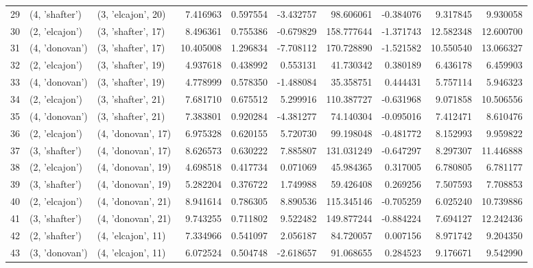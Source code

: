 \begin{tabular}{lllrrrrrrr}
29 &   (4, 'shafter') &  (3, 'elcajon', 20) &   7.416963 &   0.597554 &  -3.432757 &   98.606061 & -0.384076 &   9.317845 &   9.930058 \\
30 &   (2, 'elcajon') &  (3, 'shafter', 17) &   8.496361 &   0.755386 &  -0.679829 &  158.777644 & -1.371743 &  12.582348 &  12.600700 \\
31 &   (4, 'donovan') &  (3, 'shafter', 17) &  10.405008 &   1.296834 &  -7.708112 &  170.728890 & -1.521582 &  10.550540 &  13.066327 \\
32 &   (2, 'elcajon') &  (3, 'shafter', 19) &   4.937618 &   0.438992 &   0.553131 &   41.730342 &  0.380189 &   6.436178 &   6.459903 \\
33 &   (4, 'donovan') &  (3, 'shafter', 19) &   4.778999 &   0.578350 &  -1.488084 &   35.358751 &  0.444431 &   5.757114 &   5.946323 \\
34 &   (2, 'elcajon') &  (3, 'shafter', 21) &   7.681710 &   0.675512 &   5.299916 &  110.387727 & -0.631968 &   9.071858 &  10.506556 \\
35 &   (4, 'donovan') &  (3, 'shafter', 21) &   7.383801 &   0.920284 &  -4.381277 &   74.140304 & -0.095016 &   7.412471 &   8.610476 \\
36 &   (2, 'elcajon') &  (4, 'donovan', 17) &   6.975328 &   0.620155 &   5.720730 &   99.198048 & -0.481772 &   8.152993 &   9.959822 \\
37 &   (3, 'shafter') &  (4, 'donovan', 17) &   8.626573 &   0.630222 &   7.885807 &  131.031249 & -0.647297 &   8.297307 &  11.446888 \\
38 &   (2, 'elcajon') &  (4, 'donovan', 19) &   4.698518 &   0.417734 &   0.071069 &   45.984365 &  0.317005 &   6.780805 &   6.781177 \\
39 &   (3, 'shafter') &  (4, 'donovan', 19) &   5.282204 &   0.376722 &   1.749988 &   59.426408 &  0.269256 &   7.507593 &   7.708853 \\
40 &   (2, 'elcajon') &  (4, 'donovan', 21) &   8.941614 &   0.786305 &   8.890536 &  115.345146 & -0.705259 &   6.025240 &  10.739886 \\
41 &   (3, 'shafter') &  (4, 'donovan', 21) &   9.743255 &   0.711802 &   9.522482 &  149.877244 & -0.884224 &   7.694127 &  12.242436 \\
42 &   (2, 'shafter') &  (4, 'elcajon', 11) &   7.334966 &   0.541097 &   2.056187 &   84.720057 &  0.007156 &   8.971742 &   9.204350 \\
43 &   (3, 'donovan') &  (4, 'elcajon', 11) &   6.072524 &   0.504748 &  -2.618657 &   91.068655 &  0.284523 &   9.176671 &   9.542990 \\

\end{tabular}
